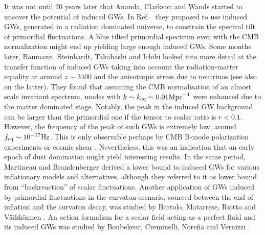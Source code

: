 \documentclass[a4paper,11pt]{article}
\numberwithin{equation}{section}
\begin{document}
It was not until 20 years later that Ananda, Clarkson and Wands \cite{Ananda:2006af} started to uncover the potential of induced GWs. In Ref.~\cite{Ananda:2006af} they proposed to use induced GWs, generated in a radiation dominated universe, to constrain the spectral tilt of primordial fluctuations. A blue tilted primordial spectrum even with the CMB normalization might end up yielding large enough induced GWs. Some months later, Baumann, Steinhardt, Takahashi and Ichiki \cite{Baumann:2007zm} looked into more detail at the transfer function of induced GWs taking into account the radiation-matter equality at around $z\sim 3400$ and the anisotropic stress due to neutrinos (see also \cite{Mangilli:2008bw} on the latter). They found that assuming the CMB normalisation of an almost scale invariant spectrum, modes with $k\sim k_{\rm eq}\sim 0.01{\rm Mpc}^{-1}$ were enhanced due to the matter dominated stage. Notably, the peak in the induced GW background can be larger than the primordial one if the tensor to scalar ratio is $r<0.1$. However, the frequency of the peak of such GWs is extremely low, around $f_{\rm eq}\sim 10^{-17}{\rm Hz}$. This is only observable perhaps by CMB B-mode polarization experiments or cosmic shear \cite{Sarkar:2008ii}. Nevertheless, this was an indication that an early epoch of dust domination might yield interesting results. In the same period, Martineau and Brandenberger \cite{Martineau:2007dj} derived a lower bound to induced GWs for various inflationary models and alternatives, although they referred to it as lower bound from ``backreaction'' of scalar fluctuations. Another application of GWs induced by primordial fluctuations in the curvaton scenario, sourced between the end of inflation and the curvaton decay, was studied by Bartolo, Matarrese, Riotto and V{\"a}ihk{\"o}nnen \cite{Bartolo:2007vp}. An action formalism for a scalar field acting as a perfect fluid and its induced GWs was studied by Boubekeur, Creminelli, Nore{\~n}a and Vernizzi \cite{Boubekeur:2008kn}.
 
\end{document}
